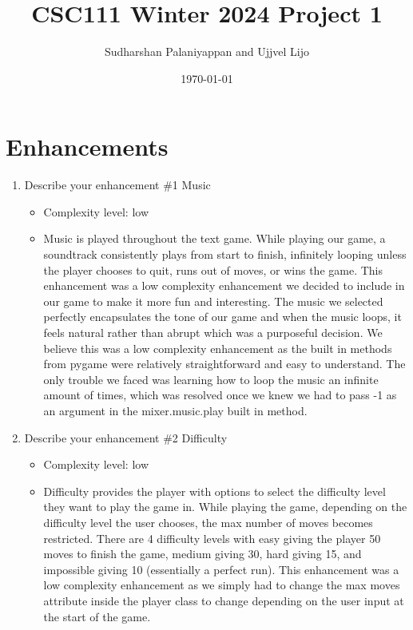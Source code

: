 \documentclass[11pt]{article}
\title{CSC111 Winter 2024 Project 1}
\author{Sudharshan Palaniyappan and Ujjvel Lijo}
\date{\today}
\begin{document}
\maketitle

\section*{Enhancements}


\begin{enumerate}

\item Describe your enhancement \#1 Music
	\begin{itemize}
	\item Complexity level: low
	\item Music is played throughout the text game. While playing our game, a soundtrack consistently plays from start to finish, infinitely looping unless the player chooses to quit, runs out of moves, or wins the game. This enhancement was a low complexity enhancement we decided to include in our game to make it more fun and interesting. The music we selected perfectly encapsulates the tone of our game and when the music loops, it feels natural rather than abrupt which was a purposeful decision. We believe this was a low complexity enhancement as the built in methods from pygame were relatively straightforward and easy to understand. The only trouble we faced was learning how to loop the music an infinite amount of times, which was resolved once we knew we had to pass -1 as an argument in the mixer.music.play built in method.
	\end{itemize}

\item Describe your enhancement \#2 Difficulty
	\begin{itemize}
	\item Complexity level: low
    \item Difficulty provides the player with options to select the difficulty level they want to play the game in. While playing the game, depending on the difficulty level the user chooses, the max number of moves becomes restricted. There are 4 difficulty levels with easy giving the player 50 moves to finish the game, medium giving 30, hard giving 15, and impossible giving 10 (essentially a perfect run). This enhancement was a low complexity enhancement as we simply had to change the max moves attribute inside the player class to change depending on the user input at the start of the game.
	\end{itemize}


\end{enumerate}
\end{document}
